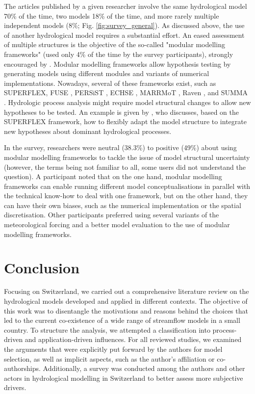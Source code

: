 \documentclass[10pt,a4paper]{article}
\begin{document}
The articles published by a given researcher involve the same hydrological model 70\% of the time, two models 18\% of the time, and more rarely multiple independent models (8\%; Fig. \ref{fig:survey_general}). As discussed above, the use of another hydrological model requires a substantial effort. An eased assessment of multiple structures is the objective of the so-called "modular modelling frameworks" (used only 4\% of the time by the survey participants), strongly encouraged by \citet{Clark2011a}. Modular modelling frameworks allow hypothesis testing by generating models using different modules and variants of numerical implementations. Nowadays, several of these frameworks exist, such as SUPERFLEX, FUSE \citep{Clark2008}, PERSiST \citep{Futter2014}, ECHSE \citep{Kneis2015}, MARRMoT \citep{Knoben2019}, Raven \citep{Craig2020}, and SUMMA \citep{Clark2015}. Hydrologic process analysis might require model structural changes to allow new hypotheses to be tested. An example is given by \citet{DalMolin2020}, who discusses, based on the SUPERFLEX framework, how to flexibly adapt the model structure to integrate new hypotheses about dominant hydrological processes. 

In the survey, researchers were neutral (38.3\%) to positive (49\%) about using modular modelling frameworks to tackle the issue of model structural uncertainty (however, the terms being not familiar to all, some users did not understand the question). A participant noted that on the one hand, modular modelling frameworks can enable running different model conceptualisations in parallel with the technical know-how to deal with one framework, but on the other hand, they can have their own biases, such as the numerical implementation or the spatial discretisation. Other participants preferred using several variants of the meteorological forcing and a better model evaluation to the use of modular modelling frameworks.


\section{Conclusion}
\label{sec:conclusion}

Focusing on Switzerland, we carried out a comprehensive literature review on the hydrological models developed and applied in different contexts. The objective of this work was to disentangle the motivations and reasons behind the choices that led to the current co-existence of a wide range of streamflow models in a small country. To structure the analysis, we attempted a classification into process-driven and application-driven influences. For all reviewed studies, we examined the arguments that were explicitly put forward by the authors for model selection, as well as implicit aspects, such as the author's affiliation or co-authorships. Additionally, a survey was conducted among the authors and other actors in hydrological modelling in Switzerland to better assess more subjective drivers.
\end{document}
